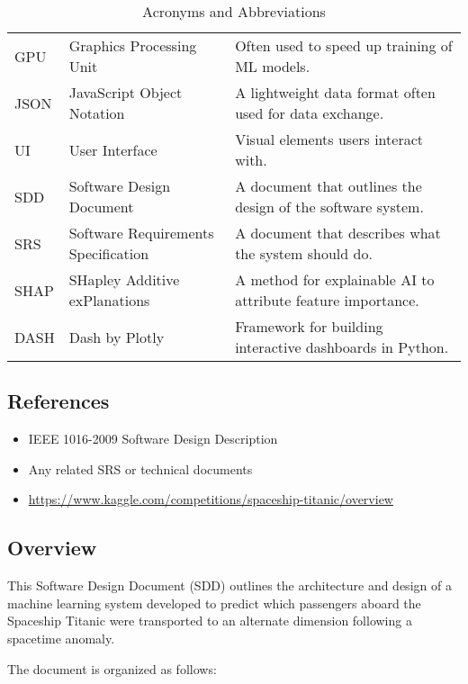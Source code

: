 \documentclass[15pt]{article}
\begin{document}
\begin{table}[h!]
\begin{tabular}{|l|l|p{8cm}|}
    GPU      & Graphics Processing Unit           & Often used to speed up training of ML models. \\
    JSON     & JavaScript Object Notation         & A lightweight data format often used for data exchange. \\
    UI       & User Interface                     & Visual elements users interact with. \\
    SDD      & Software Design Document           & A document that outlines the design of the software system. \\
    SRS      & Software Requirements Specification & A document that describes what the system should do. \\
    SHAP     & SHapley Additive exPlanations      & A method for explainable AI to attribute feature importance. \\
    DASH     & Dash by Plotly                     & Framework for building interactive dashboards in Python. \\
    \hline
    \end{tabular}
    \caption{Acronyms and Abbreviations}
\end{table}

\subsection{References}
\begin{itemize}
    \item IEEE 1016-2009 Software Design Description
    \item Any related SRS or technical documents
    \item \url{https://www.kaggle.com/competitions/spaceship-titanic/overview}
\end{itemize}

\subsection{Overview}
This Software Design Document (SDD) outlines the architecture and design of a machine learning system developed to predict which passengers aboard the Spaceship Titanic were transported to an alternate dimension following a spacetime anomaly.

The document is organized as follows:
\end{document}
